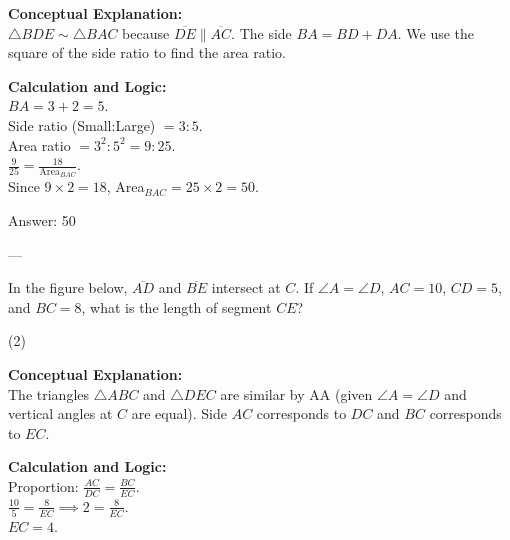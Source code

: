 \documentclass[11pt,paper=a4,answers]{exam}
\begin{document}
\begin{questions}
\begin{solution}
\textbf{Conceptual Explanation:} \\
$\triangle BDE \sim \triangle BAC$ because $\overline{DE} \parallel \overline{AC}$. The side $BA = BD + DA$. We use the square of the side ratio to find the area ratio.

\vspace{10pt}
\textbf{Calculation and Logic:} \\
$BA = 3 + 2 = 5$. \\
Side ratio (Small:Large) $= 3:5$. \\
Area ratio $= 3^2:5^2 = 9:25$. \\
$\frac{9}{25} = \frac{18}{\text{Area}_{BAC}}$. \\
Since $9 \times 2 = 18$, Area$_{BAC} = 25 \times 2 = 50$.

\vspace{15pt}
Answer: \colorbox{yellow!100}{50}
\end{solution}

---

\question
In the figure below, $\overline{AD}$ and $\overline{BE}$ intersect at $C$. If $\angle A = \angle D$, $AC = 10$, $CD = 5$, and $BC = 8$, what is the length of segment $CE$?
\begin{center}
\end{center}
\begin{tasks}(2)
\end{tasks}

\begin{solution}
\textbf{Conceptual Explanation:} \\
The triangles $\triangle ABC$ and $\triangle DEC$ are similar by AA (given $\angle A = \angle D$ and vertical angles at $C$ are equal). Side $AC$ corresponds to $DC$ and $BC$ corresponds to $EC$.

\vspace{10pt}
\textbf{Calculation and Logic:} \\
Proportion: $\frac{AC}{DC} = \frac{BC}{EC}$. \\
$\frac{10}{5} = \frac{8}{EC} \implies 2 = \frac{8}{EC}$. \\
$EC = 4$.


\end{solution}
\end{questions}
\end{document}
